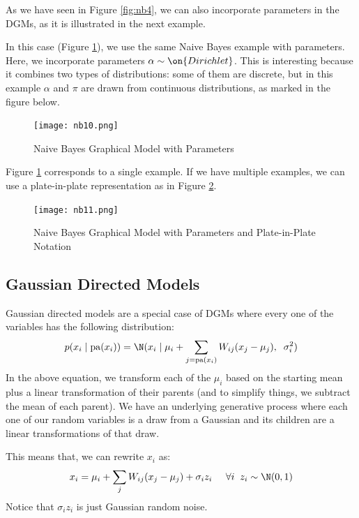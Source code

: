 \documentclass{article}
\begin{document}
As we have seen in Figure \ref{fig:nb4}, we can also incorporate parameters in the DGMs, as it is illustrated in the next example.
\begin{example}
In this case (Figure \ref{fig:nb10}), we use the same Naive Bayes example with parameters. Here, we incorporate parameters $\alpha \sim \on{Dirichlet}$. This is interesting because it combines two types of distributions: some of them are discrete, but in this example $\alpha$ and $\pi$ are drawn from continuous distributions, as marked in the figure below.
\begin{figure}[!ht]
    \centering
    \texttt{[image: nb10.png]}
    \caption{Naive Bayes Graphical Model with Parameters}
    \label{fig:nb10}
\end{figure}
\end{example}
\FloatBarrier
Figure \ref{fig:nb10} corresponds to a single example. 
If we have multiple examples, we can use a plate-in-plate representation as in Figure \ref{fig:nb11}. 
\begin{figure}[!ht]
    \centering
    \texttt{[image: nb11.png]}
    \caption{Naive Bayes Graphical Model with Parameters and Plate-in-Plate Notation}
    \label{fig:nb11}
\end{figure}

\subsection{Gaussian Directed Models}
Gaussian directed models are a special case of DGMs where every one of the variables has the following distribution:
\[
p(x_i \mid \mathrm{pa}(x_i)) = \N (x_i \mid \mu_i + \sum_{j = \mathrm{pa}(x_i)} W_{ij} (x_{j} - \mu_j), \;\; \sigma_i^2) 
\]
In the above equation, we transform each of the $\mu_i$ based on the starting mean plus a linear transformation of their parents (and to simplify things, we subtract the mean of each parent). We have an underlying generative process where each one of our random variables is a draw from a Gaussian and its children  are a linear transformations of that draw.

This means that, we can rewrite $x_{i}$ as:
\[
x_i = \mu_i + \sum_j W_{ij} (x_j - \mu_j) + \sigma_i z_i \;\;\;\;\; \forall i \;\; z_i \sim \N(0,1)
\]
Notice that $\sigma_i z_i$ is just Gaussian random noise.
\end{document}
